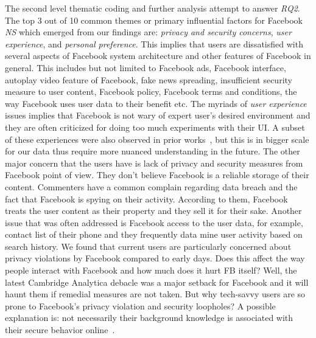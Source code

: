 The second level thematic coding and further analysis attempt to answer \emph{RQ2}. The top 3 out of 10 common themes or primary influential factors for Facebook \textit{NS} which emerged from our findings are: \textit{privacy and security concerns}, \textit{user experience}, and \textit{personal preference}. This implies that users are dissatisfied with several aspects of Facebook system architecture and other features of Facebook in general. This includes but not limited to Facebook ads, Facebook interface, autoplay video feature of Facebook, fake news spreading, insufficient security measure to user content, Facebook policy, Facebook terms and conditions, the way Facebook uses user data to their benefit etc. The myriads of \textit{user experience} issues implies that Facebook is not wary of expert user's desired environment and they are often criticized for doing too much experiments with their UI. A subset of these experiences were also observed in prior works~\cite{lampe2013users, baumer2013limiting, baker2011their}, but this is in bigger scale for our data thus require more nuanced understanding in the future. The other major concern that the users have is lack of privacy and security measures from Facebook point of view. They don't believe Facebook is a reliable storage of their content. Commenters have a common complain regarding data breach and the fact that Facebook is spying on their activity. According to them, Facebook treats the user content as their property and they sell it for their sake. Another issue that was often addressed is Facebook access to the user data, for example, contact list of their phone and they frequently data mine user activity based on search history. We found that current users are particularly concerned about privacy violations by Facebook compared to early days. Does this affect the way people interact with Facebook and how much does it hurt FB itself? Well, the latest Cambridge Analytica debacle was a major setback for Facebook and it will haunt them if remedial measures are not taken. But why tech-savvy users are so prone to Facebook's privacy violation and security loopholes? A possible explanation is: not necessarily their background knowledge is associated with their secure behavior online~\cite{kang2015my}. 


